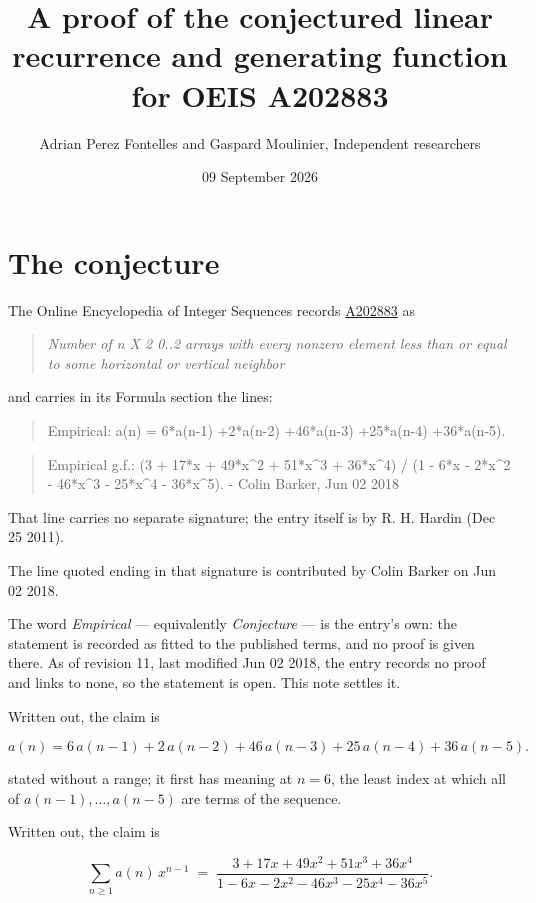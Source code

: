 \documentclass[11pt]{article}
\title{A proof of the conjectured linear recurrence and generating function for OEIS A202883}
\author{Adrian Perez Fontelles and Gaspard Moulinier, Independent researchers}
\date{09 September 2026}
\theoremstyle{definition}
\begin{document}
\maketitle
\section{The conjecture}

The Online Encyclopedia of Integer Sequences records \href{https://oeis.org/A202883}{A202883} as

\begin{quote}\itshape Number of n X 2 0..2 arrays with every nonzero element less than or equal to some horizontal or vertical neighbor\end{quote}

and carries in its Formula section the lines:

\begin{quote}\ttfamily Empirical: a(n) = 6*a(n-1) +2*a(n-2) +46*a(n-3) +25*a(n-4) +36*a(n-5).\end{quote}

\begin{quote}\ttfamily Empirical g.f.: (3 + 17*x + 49*x\textasciicircum{}2 + 51*x\textasciicircum{}3 + 36*x\textasciicircum{}4) / (1 - 6*x - 2*x\textasciicircum{}2 - 46*x\textasciicircum{}3 - 25*x\textasciicircum{}4 - 36*x\textasciicircum{}5). - Colin Barker, Jun 02 2018\end{quote}

That line carries no separate signature; the entry itself is by R. H. Hardin (Dec 25 2011).

The line quoted ending in that signature is contributed by Colin Barker on Jun 02 2018.

The word {\itshape Empirical} --- equivalently {\itshape Conjecture} --- is the entry's own: the statement is recorded as fitted to the published terms, and no proof is given there. As of revision 11, last modified Jun 02 2018, the entry records no proof and links to none, so the statement is open. This note settles it.

Written out, the claim is

\[a(n) = 6\,a(n-1) + 2\,a(n-2) + 46\,a(n-3) + 25\,a(n-4) + 36\,a(n-5).\]

stated without a range; it first has meaning at $n = 6$, the least index at which all of $a(n-1),\dots,a(n-5)$ are terms of the sequence.

Written out, the claim is

\[\sum_{n \ge 1} a(n)\,x^{n-1} \;=\; \frac{3 + 17x + 49x^{2} + 51x^{3} + 36x^{4}}{1 - 6x - 2x^{2} - 46x^{3} - 25x^{4} - 36x^{5}}.\]
\end{document}
